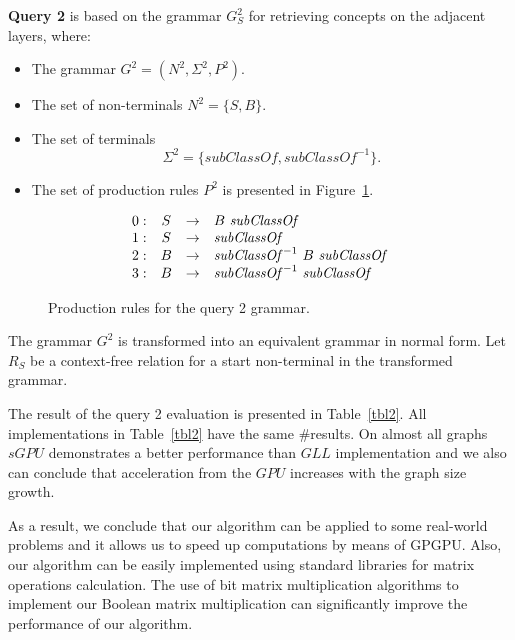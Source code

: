 \textbf{Query 2} is based on the grammar $G^2_S$ for retrieving concepts on the adjacent layers, where:
\begin{itemize}
    \item The grammar $G^2 = (N^2, \Sigma^2, P^2)$.
    \item The set of non-terminals $N^2 = \{S, B\}$.
    \item The set of terminals $$\Sigma^2 = \{subClassOf, subClassOf^{-1}\}.$$
    \item The set of production rules $P^2$ is presented in Figure~\ref{ProductionRulesQuery2}.
\end{itemize}

\begin{figure}[h]
   \[
\begin{array}{rccl}
   0: & S & \rightarrow & B \ \text{\textit{subClassOf}} \\ 
   1: & S & \rightarrow & \text{\textit{subClassOf}} \\ 
   2: & B & \rightarrow & \text{\textit{subClassOf}}^{-1} \ B \ \text{\textit{subClassOf}} \\ 
   3: & B & \rightarrow & \text{\textit{subClassOf}}^{-1} \ \text{\textit{subClassOf}} \\ 
\end{array}
\]
\caption{Production rules for the query 2 grammar.}
\label{ProductionRulesQuery2}
\end{figure}

The grammar $G^2$ is transformed into an equivalent grammar in normal form. Let $R_S$ be a context-free relation for a start non-terminal in the transformed grammar.

The result of the query 2 evaluation is presented in Table~\ref{tbl2}. All implementations in Table~\ref{tbl2} have the same \#results. On almost all graphs $sGPU$ demonstrates a better performance than $GLL$ implementation and we also can conclude that acceleration from the $GPU$ increases with the graph size growth.

As a result, we conclude that our algorithm can be applied to some real-world problems and it allows us to speed up computations by means of GPGPU. Also, our algorithm can be easily implemented using standard libraries for matrix operations calculation. The use of bit matrix multiplication algorithms to implement our Boolean matrix multiplication can significantly improve the performance of our algorithm.
